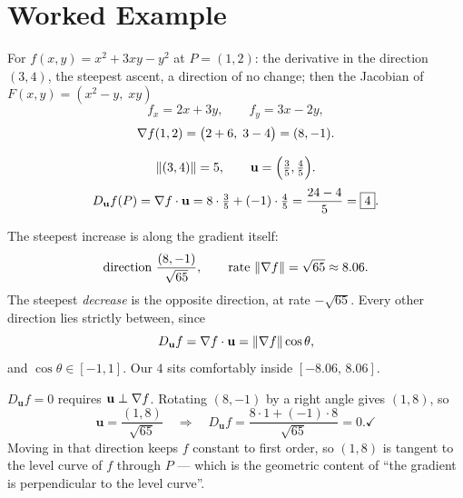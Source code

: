 \section{Worked Example}

\begin{worked}{For $f(x,y)=x^{2}+3xy-y^{2}$ at $P=(1,2)$: the derivative in the direction $(3,4)$, the steepest ascent, a direction of no change; then the Jacobian of $F(x,y)=(x^{2}-y,\;xy)$}
\[
  f_{x}=2x+3y,\qquad f_{y}=3x-2y,
\]
\[
  \nabla f(1,2)=\bigl(2+6,\;3-4\bigr)=(8,-1).
\]

\[
  \|(3,4)\|=5,
  \qquad
  \mathbf u=\Bigl(\tfrac35,\tfrac45\Bigr).
\]
\[
  D_{\mathbf u}f(P)=\nabla f\cdot\mathbf u=8\cdot\tfrac35+(-1)\cdot\tfrac45
  =\frac{24-4}{5}=\boxed{4}.
\]

The steepest increase is along the gradient itself:
\[
  \text{direction }\frac{(8,-1)}{\sqrt{65}},
  \qquad
  \text{rate }\|\nabla f\|=\sqrt{65}\approx8.06 .
\]
The steepest \emph{decrease} is the opposite direction, at rate
$-\sqrt{65}$. Every other direction lies strictly between, since
\[
  D_{\mathbf u}f=\nabla f\cdot\mathbf u=\|\nabla f\|\cos\theta ,
\]
and $\cos\theta\in[-1,1]$. Our $4$ sits comfortably inside
$[-8.06,\,8.06]$. \checkmark
{}

$D_{\mathbf u}f=0$ requires $\mathbf u\perp\nabla f$. Rotating $(8,-1)$ by a
right angle gives $(1,8)$, so
\[
  \mathbf u=\frac{(1,8)}{\sqrt{65}}
  \quad\Longrightarrow\quad
  D_{\mathbf u}f=\frac{8\cdot1+(-1)\cdot8}{\sqrt{65}}=0 . \checkmark
\]
Moving in that direction keeps $f$ constant to first order, so $(1,8)$ is
tangent to the level curve of $f$ through $P$ --- which is the geometric
content of ``the gradient is perpendicular to the level curve''.


\end{worked}
